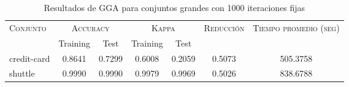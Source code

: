 \begin{table}[]
\centering
\begin{tabular}{l c c c c c c}
\hline
\multirow{2}{*}{\textsc{Conjunto}}
	& \multicolumn{2}{c}{\textsc{Accuracy}}
	& \multicolumn{2}{c}{\textsc{Kappa}}
	& \textsc{Reducción}
	& \textsc{Tiempo promedio (seg)} \\
	& Training & Test
	& Training & Test \\ 
\hline
\hline

credit-card & 0.8641 & 0.7299 & 0.6008 & 0.2059 & 0.5073 & 505.3758 \\
shuttle & 0.9990 & 0.9990 & 0.9979 & 0.9969 & 0.5026 & 838.6788 \\

\hline
\end{tabular}
\caption{Resultados de GGA para conjuntos grandes con 1000 iteraciones fijas}
\label{res-grande-gga}
\end{table}

